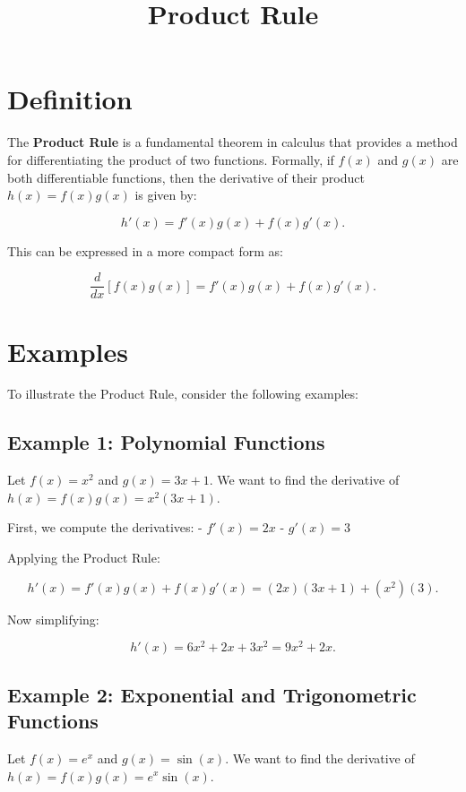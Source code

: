 \documentclass[11pt,a4paper]{article}
\title{Product Rule}
\date{}
\begin{document}
\maketitle
\section{Definition}
The \textbf{Product Rule} is a fundamental theorem in calculus that provides a method for differentiating the product of two functions. Formally, if \( f(x) \) and \( g(x) \) are both differentiable functions, then the derivative of their product \( h(x) = f(x)g(x) \) is given by:

\begin{equation}
h'(x) = f'(x)g(x) + f(x)g'(x).
\end{equation}

This can be expressed in a more compact form as:

\begin{equation}
\frac{d}{dx}[f(x)g(x)] = f'(x)g(x) + f(x)g'(x).
\end{equation}

\section{Examples}
To illustrate the Product Rule, consider the following examples:

\subsection{Example 1: Polynomial Functions}
Let \( f(x) = x^2 \) and \( g(x) = 3x + 1 \). We want to find the derivative of \( h(x) = f(x)g(x) = x^2(3x + 1) \).

First, we compute the derivatives:
- \( f'(x) = 2x \)
- \( g'(x) = 3 \)

Applying the Product Rule:

\[
h'(x) = f'(x)g(x) + f(x)g'(x) = (2x)(3x + 1) + (x^2)(3).
\]

Now simplifying:

\[
h'(x) = 6x^2 + 2x + 3x^2 = 9x^2 + 2x.
\]

\subsection{Example 2: Exponential and Trigonometric Functions}
Let \( f(x) = e^x \) and \( g(x) = \sin(x) \). We want to find the derivative of \( h(x) = f(x)g(x) = e^x \sin(x) \).
\end{document}

